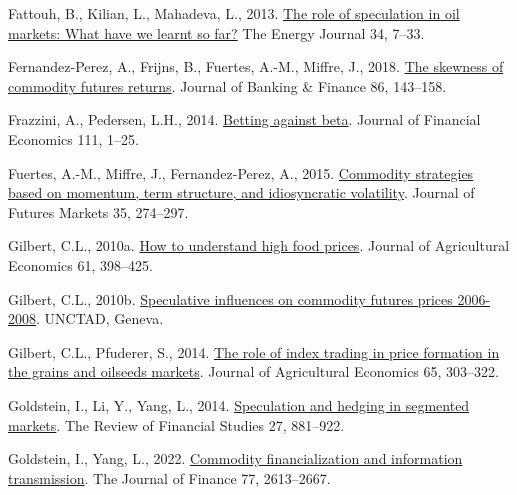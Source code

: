 \documentclass[]{elsarticle} %
\newlength{\cslhangindent}
\newlength{\cslentryspacingunit} %
\newenvironment{CSLReferences}[2] %
 {%
  \setlength{\parindent}{0pt}
  \ifodd #1
  \let\oldpar\par
  \def\par{\hangindent=\cslhangindent\oldpar}
  \fi
  \setlength{\parskip}{#2\cslentryspacingunit}
 }%
 {}
\begin{document}
\begin{CSLReferences}{1}{0}
\leavevmode{}%
Fattouh, B., Kilian, L., Mahadeva, L., 2013. \href{https://www.jstor.org/stable/41970495}{The role of speculation in oil markets: What have we learnt so far?} The Energy Journal 34, 7--33.

\leavevmode{}%
Fernandez-Perez, A., Frijns, B., Fuertes, A.-M., Miffre, J., 2018. \href{https://doi.org/10.1016/j.jbankfin.2017.06.015}{The skewness of commodity futures returns}. Journal of Banking \& Finance 86, 143--158.

\leavevmode{}%
Frazzini, A., Pedersen, L.H., 2014. \href{https://doi.org/10.1016/j.jfineco.2013.10.005}{Betting against beta}. Journal of Financial Economics 111, 1--25.

\leavevmode{}%
Fuertes, A.-M., Miffre, J., Fernandez-Perez, A., 2015. \href{https://doi.org/10.1002/fut.21656}{Commodity strategies based on momentum, term structure, and idiosyncratic volatility}. Journal of Futures Markets 35, 274--297.

\leavevmode{}%
Gilbert, C.L., 2010a. \href{https://doi.org/10.1111/j.1477-9552.2010.00248.x}{How to understand high food prices}. Journal of Agricultural Economics 61, 398--425.

\leavevmode{}%
Gilbert, C.L., 2010b. \href{https://www.cftc.gov/sites/default/files/idc/groups/public/@swaps/documents/file/plstudy_14_cifrem.pdf}{Speculative influences on commodity futures prices 2006-2008}. UNCTAD, Geneva.

\leavevmode{}%
Gilbert, C.L., Pfuderer, S., 2014. \href{https://doi.org/10.1111/1477-9552.12068}{The role of index trading in price formation in the grains and oilseeds markets}. Journal of Agricultural Economics 65, 303--322.

\leavevmode{}%
Goldstein, I., Li, Y., Yang, L., 2014. \href{https://doi.org/10.1093/rfs/hht059}{Speculation and hedging in segmented markets}. The Review of Financial Studies 27, 881--922.

\leavevmode{}%
Goldstein, I., Yang, L., 2022. \href{https://doi.org/10.1111/jofi.13165}{Commodity financialization and information transmission}. The Journal of Finance 77, 2613--2667.


\end{CSLReferences}
\end{document}
